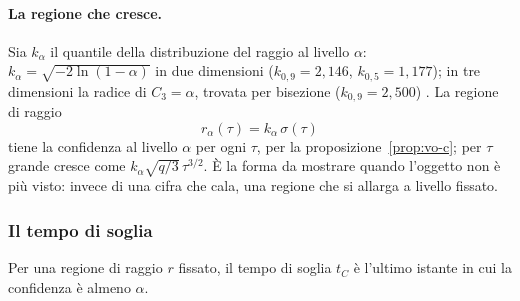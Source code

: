 \paragraph{La regione che cresce.} Sia $k_\alpha$ il quantile della distribuzione del raggio al livello $\alpha$: $k_\alpha=\sqrt{-2\ln(1-\alpha)}$ in due dimensioni ($k_{0,9}=2{,}146$, $k_{0,5}=1{,}177$); in tre dimensioni la radice di $C_3=\alpha$, trovata per bisezione ($k_{0,9}=2{,}500$) . La regione di raggio
\begin{equation}\label{eq:vo-ralpha}
r_\alpha(\tau)=k_\alpha\,\sigma(\tau)
\end{equation}
tiene la confidenza al livello $\alpha$ per ogni $\tau$, per la proposizione~\ref{prop:vo-c}; per $\tau$ grande cresce come $k_\alpha\sqrt{q/3}\,\tau^{3/2}$. È la forma da mostrare quando l'oggetto non è più visto: invece di una cifra che cala, una regione che si allarga a livello fissato.

\subsubsection{Il tempo di soglia}\label{sec:vo-tc}

Per una regione di raggio $r$ fissato, il tempo di soglia $t_C$ è l'ultimo istante in cui la confidenza è almeno $\alpha$.

